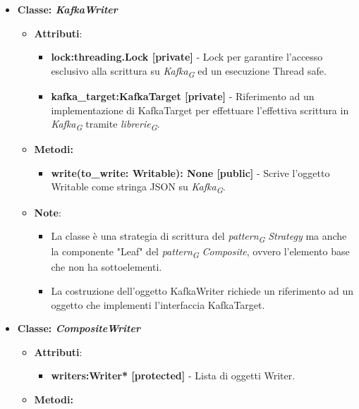 \begin{itemize}
\begin{itemize}
\begin{itemize}
        \end{itemize}
    \end{itemize}
    \item{\textbf{Classe: \textit{KafkaWriter}}}
    \begin{itemize}
    \item\textbf{Attributi}:
        \begin{itemize}
        \item \textbf{lock:threading.Lock [private]} - Lock per garantire l'accesso esclusivo alla scrittura su \textit{Kafka}\textsubscript{\textit{G}} ed un esecuzione Thread safe.
        \item \textbf{kafka\_target:KafkaTarget [private]} - Riferimento ad un implementazione di KafkaTarget per effettuare l'effettiva scrittura in \textit{Kafka}\textsubscript{\textit{G}} tramite \textit{librerie}\textsubscript{\textit{G}}.
    \end{itemize}
    \item \textbf{Metodi: }
    \begin{itemize}
        \item \textbf{write(to\_write: Writable): None [public]} - Scrive l'oggetto Writable come stringa JSON su \textit{Kafka}\textsubscript{\textit{G}}.
    \end{itemize}
    \item\textbf{Note}:
        \begin{itemize}
            \item La classe è una strategia di scrittura del \textit{pattern}\textsubscript{\textit{G}} \textit{Strategy} ma anche la componente "Leaf" del \textit{pattern}\textsubscript{\textit{G}} \textit{Composite}, ovvero l'elemento base che non ha sottoelementi.
            \item La costruzione dell'oggetto KafkaWriter richiede un riferimento ad un oggetto che implementi l'interfaccia KafkaTarget.
        \end{itemize}
    \end{itemize}
    \item{\textbf{Classe: \textit{CompositeWriter}}}
    \begin{itemize}
    \item\textbf{Attributi}:
        \begin{itemize}
        \item \textbf{writers:Writer* [protected]} - Lista di oggetti Writer.
    \end{itemize}
    \item \textbf{Metodi: }

\end{itemize}
\end{itemize}
